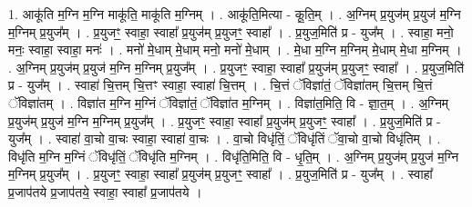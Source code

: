 \documentclass[17pt]{extarticle}
\begin{document}
1. आकू॑ति म॒ग्नि म॒ग्नि माकू॑ति॒ माकू॑ति म॒ग्निम् । . आकू॑ति॒मित्या - कू॒ति॒म् । . अ॒ग्निम् प्र॒युज॑म् प्र॒युज॑ म॒ग्नि म॒ग्निम् प्र॒युज᳚म् । . प्र॒युजꣳ॒॒ स्वाहा॒ स्वाहा᳚ प्र॒युज॑म् प्र॒युजꣳ॒॒ स्वाहा᳚ । . प्र॒युज॒मिति॑ प्र - युज᳚म् । . स्वाहा॒ मनो॒ मनः॒ स्वाहा॒ स्वाहा॒ मनः॑ । . मनो॑ मे॒धाम् मे॒धाम् मनो॒ मनो॑ मे॒धाम् । . मे॒धा म॒ग्नि म॒ग्निम् मे॒धाम् मे॒धा म॒ग्निम् । . अ॒ग्निम् प्र॒युज॑म् प्र॒युज॑ म॒ग्नि म॒ग्निम् प्र॒युज᳚म् । . प्र॒युजꣳ॒॒ स्वाहा॒ स्वाहा᳚ प्र॒युज॑म् प्र॒युजꣳ॒॒ स्वाहा᳚ । . प्र॒युज॒मिति॑ प्र - युज᳚म् । . स्वाहा॑ चि॒त्तम् चि॒त्तꣳ स्वाहा॒ स्वाहा॑ चि॒त्तम् । . चि॒त्तं ॅविज्ञा॑तं॒ ॅविज्ञा॑तम् चि॒त्तम् चि॒त्तं ॅविज्ञा॑तम् । . विज्ञा॑त म॒ग्नि म॒ग्निं ॅविज्ञा॑तं॒ ॅविज्ञा॑त म॒ग्निम् । . विज्ञा॑त॒मिति॒ वि - ज्ञा॒त॒म् । . अ॒ग्निम् प्र॒युज॑म् प्र॒युज॑ म॒ग्नि म॒ग्निम् प्र॒युज᳚म् । . प्र॒युजꣳ॒॒ स्वाहा॒ स्वाहा᳚ प्र॒युज॑म् प्र॒युजꣳ॒॒ स्वाहा᳚ । . प्र॒युज॒मिति॑ प्र - युज᳚म् । . स्वाहा॑ वा॒चो वा॒चः स्वाहा॒ स्वाहा॑ वा॒चः । . वा॒चो विधृ॑तिं॒ ॅविधृ॑तिं ॅवा॒चो वा॒चो विधृ॑तिम् । . विधृ॑ति म॒ग्नि म॒ग्निं ॅविधृ॑तिं॒ ॅविधृ॑ति म॒ग्निम् । . विधृ॑ति॒मिति॒ वि - धृ॒ति॒म् । . अ॒ग्निम् प्र॒युज॑म् प्र॒युज॑ म॒ग्नि म॒ग्निम् प्र॒युज᳚म् । . प्र॒युजꣳ॒॒ स्वाहा॒ स्वाहा᳚ प्र॒युज॑म् प्र॒युजꣳ॒॒ स्वाहा᳚ । . प्र॒युज॒मिति॑ प्र - युज᳚म् । . स्वाहा᳚ प्र॒जाप॑तये प्र॒जाप॑तये॒ स्वाहा॒ स्वाहा᳚ प्र॒जाप॑तये । \newline
\end{document}
